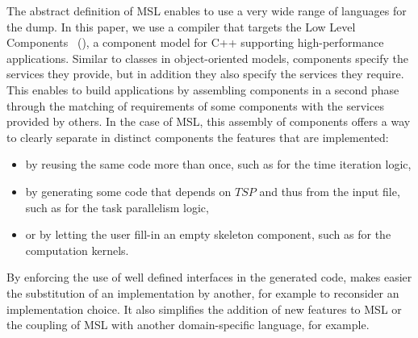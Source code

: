 

The abstract definition of MSL enables to use a very wide range of languages for the dump.
In this paper, we use a compiler that targets the Low Level Components~\cite{l2c} (\llc), a component model for C++ supporting high-performance applications.
Similar to classes in object-oriented models, components specify the services they provide, but in addition they also specify the services they require.
This enables to build applications by assembling components in a second phase through the matching of requirements of some components with the services provided by others.
In the case of MSL, this assembly of components offers a way to clearly separate in distinct components the features that are implemented:
\begin{itemize}
 \item by reusing the same code more than once, such as for the time iteration logic,
 \item by generating some code that depends on $TSP$ and thus from the input file, such as for the task parallelism logic,
 \item or by letting the user fill-in an empty skeleton component, such as for the computation kernels.
\end{itemize}
By enforcing the use of well defined interfaces in the generated code, \llc makes easier the substitution of an implementation by another, for example to reconsider an implementation choice.
It also simplifies the addition of new features to MSL or the coupling of MSL with another domain-specific language, for example.

